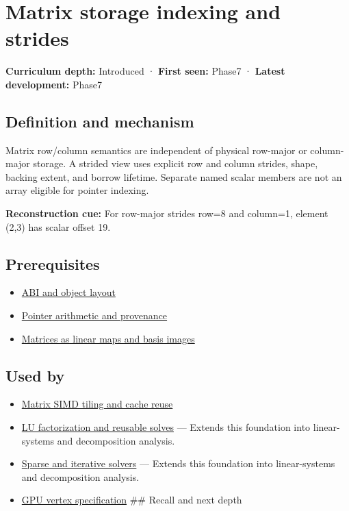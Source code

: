 \hypertarget{appendix-ffdc1d4e5350}{}\label{referencestart:appendix-ffdc1d4e5350}
\section{Matrix storage indexing and strides}\label{appendix-ffdc1d4e5350-matrix-storage-indexing-and-strides}

\textbf{Curriculum depth:} Introduced · \textbf{First seen:} Phase7 · \textbf{Latest development:} Phase7

\subsection{Definition and mechanism}\label{appendix-ffdc1d4e5350-definition-and-mechanism}

Matrix row/column semantics are independent of physical row-major or column-major storage. A strided view uses explicit row and column strides, shape, backing extent, and borrow lifetime. Separate named scalar members are not an array eligible for pointer indexing.

\textbf{Reconstruction cue:} For row-major strides row=8 and column=1, element (2,3) has scalar offset 19.

\subsection{Prerequisites}\label{appendix-ffdc1d4e5350-prerequisites}

\begin{itemize}
\tightlist
\item
  \hyperref[appendix-c4ac6bb0fff8]{ABI and object layout}
\item
  \hyperref[appendix-6af5921bc853]{Pointer arithmetic and provenance}
\item
  \hyperref[appendix-bd39c3bf5d64]{Matrices as linear maps and basis images}
\end{itemize}

\subsection{Used by}\label{appendix-ffdc1d4e5350-used-by}

\begin{itemize}
\item
  \hyperref[appendix-1bfb7c657105]{Matrix SIMD tiling and cache reuse}
\item
  \hyperref[appendix-55e4b5b0a1e6]{LU factorization and reusable solves} --- Extends this foundation into linear-systems and decomposition analysis.
\item
  \hyperref[appendix-67c87a3d9e94]{Sparse and iterative solvers} --- Extends this foundation into linear-systems and decomposition analysis.
\item
  \hyperref[appendix-749ba51a6c25]{GPU vertex specification} \#\# Recall and next depth
\end{itemize}

